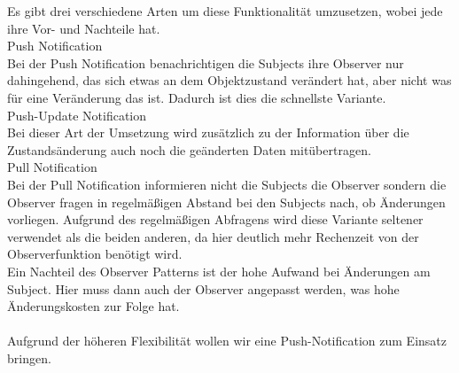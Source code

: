 Es gibt drei verschiedene Arten um diese Funktionalität umzusetzen, wobei jede ihre Vor- und 
Nachteile hat.\\ 
\newline
Push Notification\\
Bei der Push Notification benachrichtigen die Subjects ihre Observer nur dahingehend, das 
sich etwas an dem Objektzustand verändert hat, aber nicht was für eine Veränderung das ist. 
Dadurch ist dies die schnellste Variante.\\
\newline
Push-Update Notification\\
Bei dieser Art der Umsetzung wird zusätzlich zu der Information über die Zustandsänderung
auch noch die geänderten Daten mitübertragen.\\
\newline
Pull Notification\\
Bei der Pull Notification informieren nicht die Subjects die Observer sondern die Observer 
fragen in regelmäßigen Abstand bei den Subjects nach, ob Änderungen vorliegen. Aufgrund des 
regelmäßigen Abfragens wird diese Variante seltener verwendet als die beiden anderen, da hier 
deutlich mehr Rechenzeit von der Observerfunktion benötigt wird.\\
\newline
Ein Nachteil des Observer Patterns ist der hohe Aufwand bei Änderungen am
Subject. Hier muss dann auch der Observer angepasst werden, was hohe Änderungskosten zur
Folge hat.\cite{wikiObserver}\\\\
Aufgrund der höheren Flexibilität wollen wir eine Push-Notification zum Einsatz bringen.

